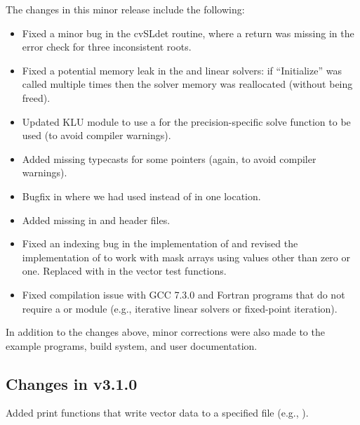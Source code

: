 The changes in this minor release include the following:
\begin{itemize}
\item Fixed a minor bug in the cvSLdet routine, where a return was missing
  in the error check for three inconsistent roots.

\item Fixed a potential memory leak in the {\spgmr} and {\spfgmr} linear
  solvers: if ``Initialize'' was called multiple times then the solver
  memory was reallocated (without being freed).

\item Updated KLU {\sunlinsol} module to use a  for the
  precision-specific solve function to be used (to avoid compiler
  warnings).

\item Added missing typecasts for some  pointers (again, to
  avoid compiler warnings).

\item Bugfix in  where we had used 
  instead of  in one location.

\item Added missing  in {\nvector} and {\sunmatrix}
  header files.

\item Fixed an indexing bug in the {\cuda} {\nvector} implementation of
   and revised the {\raja} {\nvector} implementation of
   to work with mask arrays using values other than zero or
  one. Replaced  with  in the {\raja} vector test functions.

\item Fixed compilation issue with GCC 7.3.0 and Fortran programs that do
  not require a {\sunmatrix} or {\sunlinsol} module (e.g., iterative
  linear solvers or fixed-point iteration).
\end{itemize}
In addition to the changes above, minor corrections were also made to the
example programs, build system, and user documentation.

\subsection*{Changes in v3.1.0}

Added {\nvector} print functions that write vector data to a specified
file (e.g., ).

